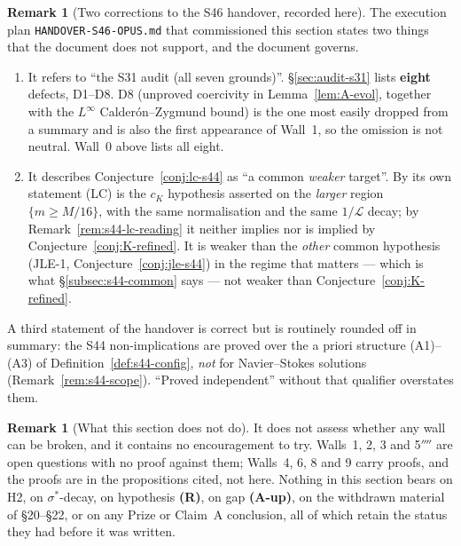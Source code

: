 \documentclass[11pt]{article}
\theoremstyle{definition}
\newtheorem{remark}[theorem]{Remark}
\theoremstyle{remark}
\begin{document}
\begin{remark}[Two corrections to the S46 handover, recorded here]
  \label{rem:s47-handover-corrigenda}
  The execution plan \texttt{HANDOVER-S46-OPUS.md} that commissioned this
  section states two things that the document does not support, and the
  document governs.
  \begin{enumerate}[label=(\roman*)]
    \item It refers to ``the S31 audit (all seven grounds)''.
      \S\ref{sec:audit-s31} lists \textbf{eight} defects, D1--D8. D8
      (unproved coercivity in Lemma~\ref{lem:A-evol}, together with the
      $L^\infty$ Calder\'on--Zygmund bound) is the one most easily dropped
      from a summary and is also the first appearance of Wall~1, so the
      omission is not neutral. Wall~0 above lists all eight.
    \item It describes Conjecture~\ref{conj:lc-s44} as ``a common
      \emph{weaker} target''. By its own statement (LC) is the $c_K$
      hypothesis asserted on the \emph{larger} region $\{m\geq M/16\}$, with
      the same normalisation and the same $1/\mathcal{L}$ decay; by
      Remark~\ref{rem:s44-lc-reading} it neither implies nor is implied by
      Conjecture~\ref{conj:K-refined}. It is weaker than the \emph{other}
      common hypothesis (JLE-1, Conjecture~\ref{conj:jle-s44}) in the regime
      that matters --- which is what \S\ref{subsec:s44-common} says --- not
      weaker than Conjecture~\ref{conj:K-refined}.
  \end{enumerate}
  A third statement of the handover is correct but is routinely rounded off
  in summary: the S44 non-implications are proved over the a priori structure
  (A1)--(A3) of Definition~\ref{def:s44-config}, \emph{not} for
  Navier--Stokes solutions (Remark~\ref{rem:s44-scope}). ``Proved
  independent'' without that qualifier overstates them.
\end{remark}

\begin{remark}[What this section does not do]\label{rem:s47-scope}
  It does not assess whether any wall can be broken, and it contains no
  encouragement to try. Walls~1, 2, 3 and 5$''''$ are open questions with no
  proof against them; Walls~4, 6, 8 and 9 carry proofs, and the proofs are in
  the propositions cited, not here. Nothing in this section bears on H2, on
  $\sigma^*$-decay, on hypothesis \textbf{(R)}, on gap \textbf{(A-up)}, on the
  withdrawn material of \S20--\S22, or on any Prize or Claim~A conclusion, all
  of which retain the status they had before it was written.
\end{remark}
\end{document}
